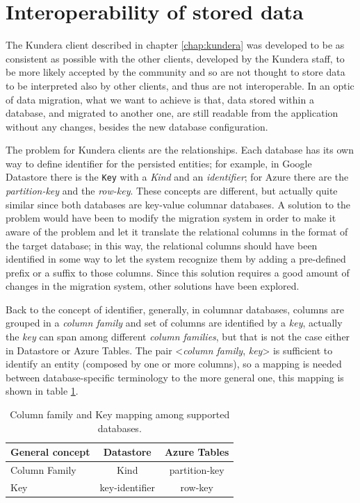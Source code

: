
\section{Interoperability of stored data}
\label{sec:data-interoperability}
The Kundera client described in chapter \ref{chap:kundera} was developed to be as consistent as possible with the other clients, developed by the Kundera staff, to be more likely accepted by the community and so are not thought to store data to be interpreted also by other clients, and thus are not interoperable.
In an optic of data migration, what we want to achieve is that, data stored within a database, and migrated to another one, are still readable from the application without any changes, besides the new database configuration. 

\noindent The problem for Kundera clients are the relationships. Each database has its own way to define identifier for the persisted entities; for example, in Google Datastore there is the \texttt{Key} with a \textit{Kind} and an \textit{identifier}; for Azure there are the \textit{partition-key} and the \textit{row-key}. These concepts are different, but actually quite similar since both databases are key-value columnar databases. 
A solution to the problem would have been to modify the migration system in order to make it aware of the problem and let it translate the relational columns in the format of the target database; in this way, the relational columns should have been identified in some way to let the system recognize them by adding a pre-defined prefix or a suffix to those columns.
Since this solution requires a good amount of changes in the migration system, other solutions have been explored.
 
\newparagraph Back to the concept of identifier, generally, in columnar databases, columns are grouped in a \textit{column family} and set of columns are identified by a \textit{key}, actually the \textit{key} can span among different \textit{column families}, but that is not the case either in Datastore or Azure Tables.
The pair \textless\textit{column family}, \textit{key}\textgreater{} is sufficient to identify an entity (composed by one or more columns), so a mapping is needed between database-specific terminology to the more general one, this mapping is shown in table \ref{table:mapping}.

\begin{table}[h]
\centering
\vspace{1em}
\renewcommand{\arraystretch}{1.4}
\begin{tabular}{lcc}
\hline
\textbf{General concept} & \textbf{Datastore} & \textbf{Azure Tables}\\ 
\hline\hline
Column Family & Kind & partition-key \\
\hline
Key & key-identifier & row-key \\
\hline
\end{tabular}
\caption{Column family and Key mapping among supported databases.}
\label{table:mapping}
\end{table}

